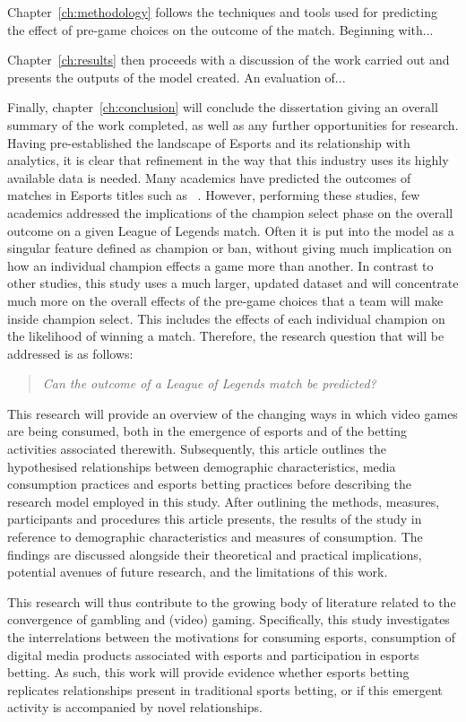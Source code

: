 Chapter~\ref{ch:methodology} follows the techniques and tools used for predicting the effect of pre-game choices on the outcome of the match.
Beginning with...


Chapter~\ref{ch:results} then proceeds with a discussion of the work
carried out and presents the outputs of the model created.
An evaluation of...

Finally, chapter~\ref{ch:conclusion} will conclude the dissertation giving an overall summary of the work completed, as well as any further opportunities for research. \\


Having pre-established the landscape of Esports and its relationship with analytics, it is clear that refinement in the way that this industry uses its highly available data is needed.
Many academics have predicted the outcomes of matches in Esports titles such as ~\citet{silva2018continuous}.
However, performing these studies, few academics addressed the implications of the champion select phase on the overall outcome on a given League of Legends match.
Often it is put into the model as a singular feature defined as champion or ban, without giving much implication on how an individual champion effects a game more than another.
In contrast to other studies, this study uses a much larger, updated dataset and will concentrate much more on the overall effects of the pre-game choices that a team will make inside champion select.
This includes the effects of each individual champion on the likelihood of winning a match.
Therefore, the research question that will be addressed is as follows:

\begin{quote}  \emph{Can the outcome of a League of Legends match be predicted?} \end{quote}


This research will provide an overview of the changing ways in which video games are being consumed, both in the emergence of esports and of the betting activities associated therewith.
Subsequently, this article outlines the hypothesised relationships between demographic characteristics, media consumption practices and esports betting practices before describing the research model employed in this study.
After outlining the methods, measures, participants and procedures this article presents, the results of the study in reference to demographic characteristics and measures of consumption.
The findings are discussed alongside their theoretical and practical implications, potential avenues of future research, and the limitations of this work.

This research will thus contribute to the growing body of literature related to the convergence of gambling and (video) gaming.
Specifically, this study investigates the interrelations between the motivations for consuming esports, consumption of digital media products associated with esports and participation in esports betting.
As such, this work will provide evidence whether esports betting replicates relationships present in traditional sports betting, or if this emergent activity is accompanied by novel relationships.